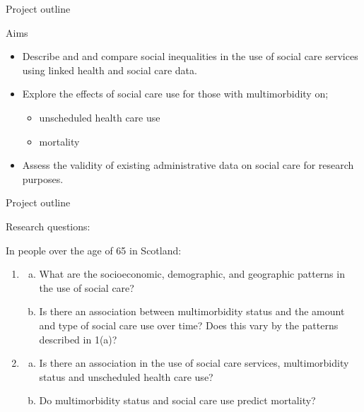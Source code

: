 \documentclass[ignorenonframetext,]{beamer}
\begin{document}
\begin{frame}{Project outline}

\begin{block}{Aims}

\begin{itemize}
\item<1-> Describe and and compare social inequalities in the use of social care services using linked health and social care data. 
\item<2-> Explore the effects of social care use for those with multimorbidity on;
\begin{itemize}
\item unscheduled health care use
\item mortality
\end{itemize}
\item<3-> Assess the validity of existing administrative data on social care for research purposes. 
\end{itemize}

\end{block}

\end{frame}

\begin{frame}{Project outline}

\begin{block}{Research questions:}

In people over the age of 65 in Scotland:

\begin{enumerate}
\item
\begin{enumerate}[(a)]
\item What are the socioeconomic, demographic, and geographic patterns in the use of social care? 
\item Is there an association between multimorbidity status and the amount and type of social care use over time? Does this vary by the patterns described in 1(a)?  
\end{enumerate}
\item 
\begin{enumerate}[(a)]
\item Is there an association in the use of social care services, multimorbidity status and unscheduled health care use?
\item Do multimorbidity status and social care use predict mortality?
\end{enumerate}
\end{enumerate}

\end{block}

\end{frame}
\end{document}
